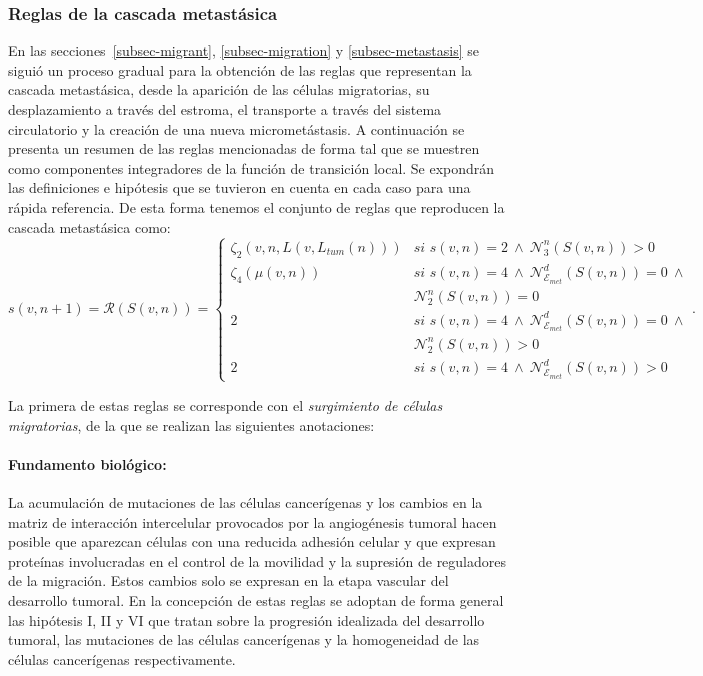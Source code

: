 \subsubsection*{Reglas de la cascada metast\'asica}
 En las secciones~\ref{subsec-migrant}, \ref{subsec-migration} y \ref{subsec-metastasis} se sigui\'o un proceso gradual para la obtenci\'on de las reglas que representan la cascada metast\'asica, desde la aparici\'on de las c\'elulas migratorias, su desplazamiento a trav\'es del estroma, el transporte a trav\'es del sistema circulatorio y la creaci\'on de una nueva micromet\'astasis. A continuaci\'on se presenta un resumen de las reglas mencionadas de forma tal que se muestren como componentes integradores de la funci\'on de transici\'on local. Se expondr\'an las definiciones e hip\'otesis que se tuvieron en cuenta en cada caso para una r\'apida referencia. De esta forma tenemos el conjunto de reglas que reproducen la cascada metast\'asica como: 
\begin{equation*}
s(v,n+1)=\mathcal{R}(S(v,n))=\left\lbrace
	\begin{array}{ll}
		\zeta_2(v,n,L(v,L_{tum}(n))) & \textit{si } s(v,n)=2~\wedge~\mathcal{N}_3^n(S(v,n)) > 0 \\[0.2cm]
		\zeta_4(\mu(v,n)) & \textit{si } s(v,n)=4~\wedge~\mathcal{N}_{\mathcal{E}_{met}}^d(S(v,n))=0~\wedge\\
				         & \mathcal{N}_2^n(S(v,n))=0 \\
		2 & \textit{si } s(v,n)=4~\wedge~\mathcal{N}_{\mathcal{E}_{met}}^d(S(v,n))=0~\wedge\\
		  & \mathcal{N}_2^n(S(v,n))>0 \\[0.2cm]
		2 & \textit{si } s(v,n)=4~\wedge~\mathcal{N}_{\mathcal{E}_{met}}^d(S(v,n))>0
	\end{array}
\right..
\end{equation*}

La primera de estas reglas se corresponde con el \emph{surgimiento de c\'elulas migratorias}, de la que se realizan las siguientes anotaciones:\label{NOT-surgimiento-celulas-migratorias}

\paragraph*{{Fundamento biol\'ogico}:} La acumulaci\'on de mutaciones de las c\'elulas cancer\'igenas y los cambios en la matriz de interacci\'on intercelular provocados por la angiog\'enesis tumoral hacen posible que aparezcan c\'elulas con una reducida adhesi\'on celular y que expresan prote\'inas involucradas en el control de la movilidad y la supresi\'on de reguladores de la migraci\'on. Estos cambios solo se expresan en la etapa vascular del desarrollo tumoral. En la concepci\'on de estas reglas se adoptan de forma general las hip\'otesis I, II y VI que tratan sobre la progresi\'on idealizada del desarrollo tumoral, las mutaciones de las c\'elulas cancer\'igenas y la homogeneidad de las c\'elulas cancer\'igenas respectivamente.

